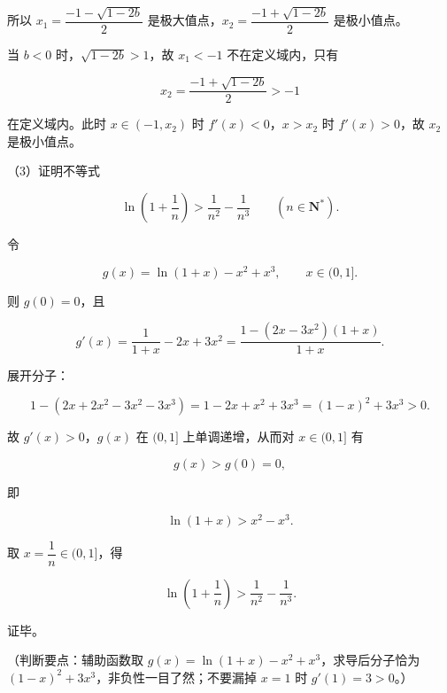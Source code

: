 \begin{answer}
所以 $x_1=\dfrac{-1-\sqrt{1-2b}}{2}$ 是极大值点，$x_2=\dfrac{-1+\sqrt{1-2b}}{2}$ 是极小值点。

当 $b<0$ 时，$\sqrt{1-2b}>1$，故 $x_1<-1$ 不在定义域内，只有

\nopagebreak[4]
\[x_2=\frac{-1+\sqrt{1-2b}}{2}>-1\]

在定义域内。此时 $x\in(-1,x_2)$ 时 $f'(x)<0$，$x>x_2$ 时 $f'(x)>0$，故 $x_2$ 是极小值点。

（3）证明不等式

\nopagebreak[4]
\[\ln\left(1+\frac1n\right)>\frac1{n^2}-\frac1{n^3}\qquad(n\in\mathbf N^*).\]

令

\nopagebreak[4]
\[g(x)=\ln(1+x)-x^2+x^3,\qquad x\in(0,1].\]

则 $g(0)=0$，且

\nopagebreak[4]
\[g'(x)=\frac{1}{1+x}-2x+3x^2=\frac{1-(2x-3x^2)(1+x)}{1+x}.\]

展开分子：

\nopagebreak[4]
\[1-(2x+2x^2-3x^2-3x^3)=1-2x+x^2+3x^3=(1-x)^2+3x^3>0.\]

故 $g'(x)>0$，$g(x)$ 在 $(0,1]$ 上单调递增，从而对 $x\in(0,1]$ 有

\nopagebreak[4]
\[g(x)>g(0)=0,\]

即

\nopagebreak[4]
\[\ln(1+x)>x^2-x^3.\]

取 $x=\dfrac1n\in(0,1]$，得

\nopagebreak[4]
\[\ln\left(1+\frac1n\right)>\frac1{n^2}-\frac1{n^3}.\]

证毕。

（判断要点：辅助函数取 $g(x)=\ln(1+x)-x^2+x^3$，求导后分子恰为 $(1-x)^2+3x^3$，非负性一目了然；不要漏掉 $x=1$ 时 $g'(1)=3>0$。）


\end{answer}